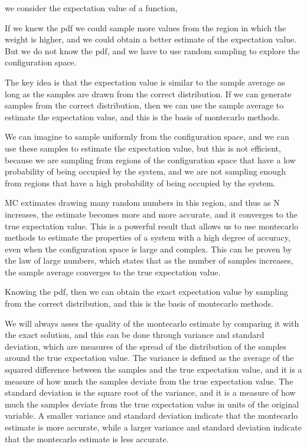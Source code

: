 \begin{example}
    we consider the expectation value of a function,

    If we knew the pdf we could sample more values from the region in which the weight is higher, and we could obtain a better estimate of the expectation value. But we do not know the pdf, and we have to use random sampling to explore the configuration space.

    The key idea is that the expectation value is similar to the sample average as long as the samples are drawn from the correct distribution. If we can generate samples from the correct distribution, then we can use the sample average to estimate the expectation value, and this is the basis of montecarlo methods.

    We can imagine to sample uniformly from the configuration space, and we can use these samples to estimate the expectation value, but this is not efficient, because we are sampling from regions of the configuration space that have a low probability of being occupied by the system, and we are not sampling enough from regions that have a high probability of being occupied by the system.

    MC extimates drawing many random numbers in this region, and thus as N increases, the estimate becomes more and more accurate, and it converges to the true expectation value. This is a powerful result that allows us to use montecarlo methods to estimate the properties of a system with a high degree of accuracy, even when the configuration space is large and complex. This can be proven by the law of large numbers, which states that as the number of samples increases, the sample average converges to the true expectation value.

    Knowing the pdf, then we can obtain the exact expectation value by sampling from the correct distribution, and this is the basis of montecarlo methods.
\end{example}

We will always asses the quality of the montecarlo estimate by comparing it with the exact solution, and this can be done through variance and standard deviation, which are measures of the spread of the distribution of the samples around the true expectation value. The variance is defined as the average of the squared difference between the samples and the true expectation value, and it is a measure of how much the samples deviate from the true expectation value. The standard deviation is the square root of the variance, and it is a measure of how much the samples deviate from the true expectation value in units of the original variable. A smaller variance and standard deviation indicate that the montecarlo estimate is more accurate, while a larger variance and standard deviation indicate that the montecarlo estimate is less accurate.

